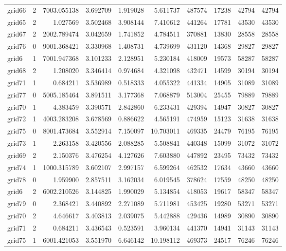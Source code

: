 \begin{longtable}{|l|r|r|r|r|r|r|r|r|r|}
grid66 & 2 & 7003.055138 & 3.692709 & 1.919028 & 5.611737 & 487574 & 17238 & 42794 & 42794 \\
grid65 & 2 & 1.027569 & 3.502468 & 3.908144 & 7.410612 & 441264 & 17781 & 43530 & 43530 \\
grid67 & 2 & 2002.789474 & 3.042659 & 1.741852 & 4.784511 & 370881 & 13830 & 28558 & 28558 \\
grid76 & 0 & 9001.368421 & 3.330968 & 1.408731 & 4.739699 & 431120 & 14368 & 29827 & 29827 \\
grid6 & 1 & 7001.947368 & 3.101233 & 2.128951 & 5.230184 & 418009 & 19573 & 58287 & 58287 \\
grid68 & 2 & 1.208020 & 3.346414 & 0.974684 & 4.321098 & 432471 & 14599 & 30194 & 30194 \\
grid71 & 1 & 0.684211 & 3.536989 & 0.518333 & 4.055322 & 441334 & 14905 & 31089 & 31089 \\
grid77 & 0 & 5005.185464 & 3.891511 & 3.177368 & 7.068879 & 513004 & 25455 & 79889 & 79889 \\
grid70 & 1 & 4.383459 & 3.390571 & 2.842860 & 6.233431 & 429394 & 14947 & 30827 & 30827 \\
grid72 & 1 & 4003.283208 & 3.678569 & 0.886622 & 4.565191 & 474959 & 15123 & 31638 & 31638 \\
grid75 & 0 & 8001.473684 & 3.552914 & 7.150097 & 10.703011 & 469335 & 24479 & 76195 & 76195 \\
grid73 & 1 & 2.263158 & 3.420556 & 2.088285 & 5.508841 & 440348 & 15099 & 31072 & 31072 \\
grid69 & 2 & 2.150376 & 3.476254 & 4.127626 & 7.603880 & 447892 & 23495 & 73432 & 73432 \\
grid74 & 1 & 1000.315789 & 3.602107 & 2.997157 & 6.599264 & 462532 & 17634 & 43660 & 43660 \\
grid78 & 0 & 1.959900 & 2.857511 & 3.162034 & 6.019545 & 378624 & 17559 & 48250 & 48250 \\
grid6 & 2 & 6002.210526 & 3.144825 & 1.990029 & 5.134854 & 418053 & 19617 & 58347 & 58347 \\
grid79 & 0 & 2.368421 & 3.440892 & 2.271089 & 5.711981 & 453425 & 19280 & 53271 & 53271 \\
grid70 & 2 & 4.646617 & 3.403813 & 2.039075 & 5.442888 & 429436 & 14989 & 30890 & 30890 \\
grid71 & 2 & 0.684211 & 3.436543 & 0.523591 & 3.960134 & 441370 & 14941 & 31143 & 31143 \\
grid75 & 1 & 6001.421053 & 3.551970 & 6.646142 & 10.198112 & 469373 & 24517 & 76246 & 76246 \\

\end{longtable}
